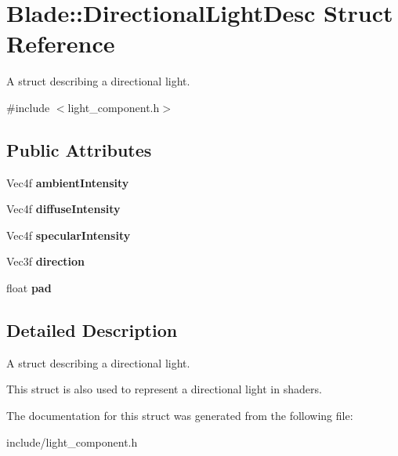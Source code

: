 \hypertarget{struct_blade_1_1_directional_light_desc}{}\section{Blade\+:\+:Directional\+Light\+Desc Struct Reference}
\label{struct_blade_1_1_directional_light_desc}


A struct describing a directional light.  




{\ttfamily \#include $<$light\+\_\+component.\+h$>$}

\subsection*{Public Attributes}
\begin{DoxyCompactItemize}
\item 
\mbox{\label{struct_blade_1_1_directional_light_desc_aed73dd21f9745383cf7fa867db98d82d}} 
Vec4f {\bfseries ambient\+Intensity}
\item 
\mbox{\label{struct_blade_1_1_directional_light_desc_a9823c4ff7f1ce4c271fbf19991c14ade}} 
Vec4f {\bfseries diffuse\+Intensity}
\item 
\mbox{\label{struct_blade_1_1_directional_light_desc_aa55d775b6be27db8f7dace2cf90340ae}} 
Vec4f {\bfseries specular\+Intensity}
\item 
\mbox{\label{struct_blade_1_1_directional_light_desc_aad27236dbfbb06db7d36c15166942094}} 
Vec3f {\bfseries direction}
\item 
\mbox{\label{struct_blade_1_1_directional_light_desc_aa5d519fa90e4f0db404bb2dc790ad46e}} 
float {\bfseries pad}
\end{DoxyCompactItemize}


\subsection{Detailed Description}
A struct describing a directional light. 

This struct is also used to represent a directional light in shaders. 

The documentation for this struct was generated from the following file\+:\begin{DoxyCompactItemize}
\item 
include/light\+\_\+component.\+h\end{DoxyCompactItemize}
